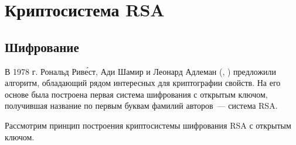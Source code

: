 \section{Криптосистема RSA}

\subsection{Шифрование}

В 1978 г. Рональд Рив\'{е}ст, Ади Шамир и Леонард Адлеман (, \cite{RSA:1978}) предложили алгоритм, обладающий рядом интересных для криптографии свойств. На его основе была построена первая система шифрования с открытым ключом, получившая название по первым буквам фамилий авторов~--- система RSA.

Рассмотрим принцип построения криптосистемы шифрования RSA с открытым ключом.

